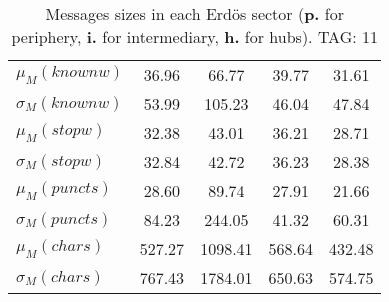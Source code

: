 \begin{table}[h!]
\begin{center}
\begin{tabular}{| l || c | c | c | c |}
$\mu_M(knownw)$ & 36.96  & 66.77  & 39.77  & 31.61 \\
$\sigma_M(knownw)$ & 53.99  & 105.23  & 46.04  & 47.84 \\\hline
$\mu_M(stopw)$ & 32.38  & 43.01  & 36.21  & 28.71 \\
$\sigma_M(stopw)$ & 32.84  & 42.72  & 36.23  & 28.38 \\\hline
$\mu_M(puncts)$ & 28.60  & 89.74  & 27.91  & 21.66 \\
$\sigma_M(puncts)$ & 84.23  & 244.05  & 41.32  & 60.31 \\\hline
$\mu_M(chars)$ & 527.27  & 1098.41  & 568.64  & 432.48 \\
$\sigma_M(chars)$ & 767.43  & 1784.01  & 650.63  & 574.75 \\\hline
\end{tabular}
\caption{Messages sizes in each Erd\"os sector ({{\bf p.}} for periphery, {{\bf i.}} for intermediary, {{\bf h.}} for hubs). TAG: 11}
\end{center}
\end{table}